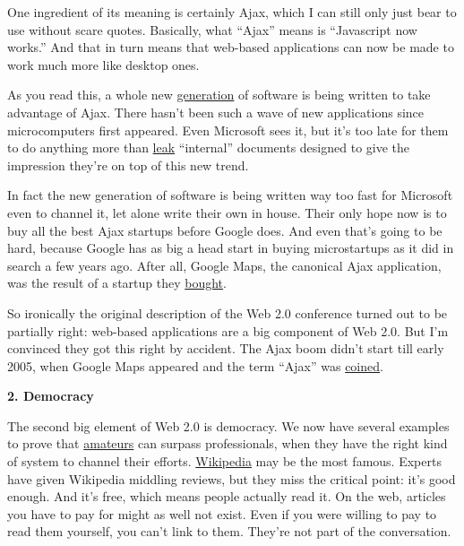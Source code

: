 One ingredient of its meaning is certainly Ajax, which I can still only
just bear to use without scare quotes. Basically, what ``Ajax'' means is
``Javascript now works.'' And that in turn means that web-based
applications can now be made to work much more like desktop ones.

As you read this, a whole new
\href{http://online.wsj.com/public/article/SB113098635587487074.html?mod=todays_\%20free_feature}{generation}
of software is being written to take advantage of Ajax. There hasn't
been such a wave of new applications since microcomputers first
appeared. Even Microsoft sees it, but it's too late for them to do
anything more than \href{http://www.hypercamp.org/2005/11/09}{leak}
``internal'' documents designed to give the impression they're on top of
this new trend.

In fact the new generation of software is being written way too fast for
Microsoft even to channel it, let alone write their own in house. Their
only hope now is to buy all the best Ajax startups before Google does.
And even that's going to be hard, because Google has as big a head start
in buying microstartups as it did in search a few years ago. After all,
Google Maps, the canonical Ajax application, was the result of a startup
they
\href{http://googlemapsmania.blogspot.com/2005/10/google-maps-lead-engineer-gaze\%20s-into.html}{bought}.

So ironically the original description of the Web 2.0 conference turned
out to be partially right: web-based applications are a big component of
Web 2.0. But I'm convinced they got this right by accident. The Ajax
boom didn't start till early 2005, when Google Maps appeared and the
term ``Ajax'' was
\href{http://www.adaptivepath.com/publications/essays/archives/000385.php}{coined}.

\textbf{2. Democracy}

The second big element of Web 2.0 is democracy. We now have several
examples to prove that \href{opensource.html}{amateurs} can surpass
professionals, when they have the right kind of system to channel their
efforts. \href{http://wikipedia.org}{Wikipedia} may be the most famous.
Experts have given Wikipedia middling reviews, but they miss the
critical point: it's good enough. And it's free, which means people
actually read it. On the web, articles you have to pay for might as well
not exist. Even if you were willing to pay to read them yourself, you
can't link to them. They're not part of the conversation.

